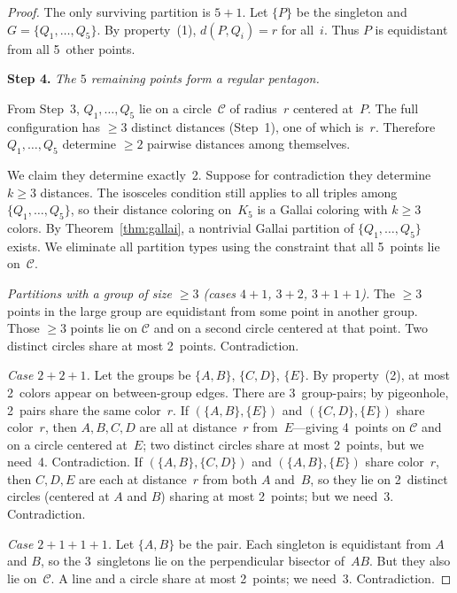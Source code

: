 \documentclass[12pt]{amsart}
\theoremstyle{definition}
\begin{document}
\begin{proof}
\smallskip
The only surviving partition is $5+1$. Let $\{P\}$ be the singleton and $G = \{Q_1, \ldots, Q_5\}$. By property~(1), $d(P, Q_i) = r$ for all~$i$. Thus $P$ is equidistant from all 5~other points.

\medskip
\noindent\textbf{Step 4.} \emph{The $5$ remaining points form a regular pentagon.}

\smallskip
From Step~3, $Q_1, \ldots, Q_5$ lie on a circle~$\mathcal{C}$ of radius~$r$ centered at~$P$. The full configuration has $\geq 3$ distinct distances (Step~1), one of which is~$r$. Therefore $Q_1, \ldots, Q_5$ determine $\geq 2$ pairwise distances among themselves.

We claim they determine exactly~2. Suppose for contradiction they determine $k \geq 3$ distances. The isosceles condition still applies to all triples among $\{Q_1, \ldots, Q_5\}$, so their distance coloring on~$K_5$ is a Gallai coloring with $k \geq 3$ colors. By Theorem~\ref{thm:gallai}, a nontrivial Gallai partition of $\{Q_1, \ldots, Q_5\}$ exists. We eliminate all partition types using the constraint that all 5~points lie on~$\mathcal{C}$.

\smallskip
\emph{Partitions with a group of size $\geq 3$ (cases $4+1$, $3+2$, $3+1+1$).} The $\geq 3$ points in the large group are equidistant from some point in another group. Those $\geq 3$ points lie on $\mathcal{C}$ and on a second circle centered at that point. Two distinct circles share at most 2~points. Contradiction.

\smallskip
\emph{Case $2+2+1$.} Let the groups be $\{A,B\}$, $\{C,D\}$, $\{E\}$. By property~(2), at most 2~colors appear on between-group edges. There are 3~group-pairs; by pigeonhole, 2~pairs share the same color~$r$. If $(\{A,B\}, \{E\})$ and $(\{C,D\}, \{E\})$ share color~$r$, then $A,B,C,D$ are all at distance~$r$ from~$E$---giving 4~points on $\mathcal{C}$ and on a circle centered at~$E$; two distinct circles share at most 2~points, but we need~4. Contradiction. If $(\{A,B\}, \{C,D\})$ and $(\{A,B\}, \{E\})$ share color~$r$, then $C,D,E$ are each at distance~$r$ from both $A$ and~$B$, so they lie on 2~distinct circles (centered at $A$ and $B$) sharing at most 2~points; but we need~3. Contradiction.

\smallskip
\emph{Case $2+1+1+1$.} Let $\{A,B\}$ be the pair. Each singleton is equidistant from $A$ and $B$, so the 3~singletons lie on the perpendicular bisector of~$AB$. But they also lie on~$\mathcal{C}$. A line and a circle share at most 2~points; we need~3. Contradiction.


\end{proof}
\end{document}

